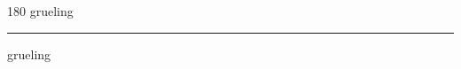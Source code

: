 
\begin{frame}
\begin{center}
\begin{turn}{180}
{\fontsize{2.5cm}{1em}\selectfont grueling}
\end{turn}
\vspace{1em}\par  
\hrule
\vspace{1em}\par  
{\fontsize{2.5cm}{1em}\selectfont grueling}
\end{center}
\end{frame}
